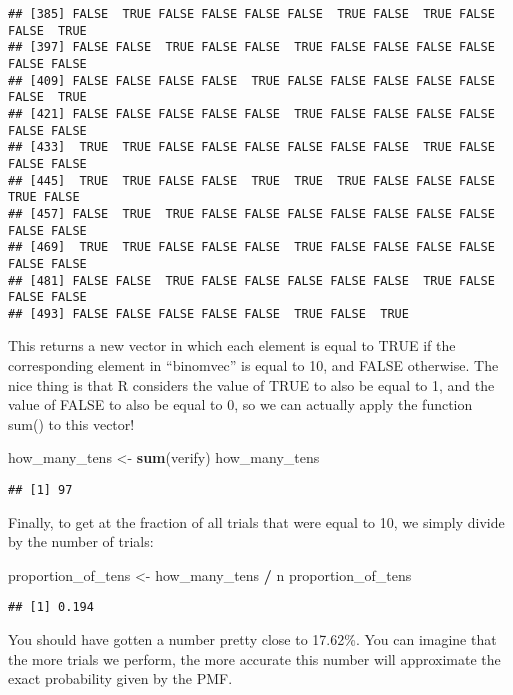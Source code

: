 \documentclass[
]{book}
\newenvironment{Shaded}{\begin{snugshade}}{\end{snugshade}}
\newcommand{\KeywordTok}[1]{\textcolor[rgb]{0.13,0.29,0.53}{\textbf{#1}}}
\newcommand{\NormalTok}[1]{#1}
\newcommand{\OperatorTok}[1]{\textcolor[rgb]{0.81,0.36,0.00}{\textbf{#1}}}
\newcommand{\StringTok}[1]{\textcolor[rgb]{0.31,0.60,0.02}{#1}}
\begin{document}
\begin{verbatim}
## [385] FALSE  TRUE FALSE FALSE FALSE FALSE  TRUE FALSE  TRUE FALSE FALSE  TRUE
## [397] FALSE FALSE  TRUE FALSE FALSE  TRUE FALSE FALSE FALSE FALSE FALSE FALSE
## [409] FALSE FALSE FALSE FALSE  TRUE FALSE FALSE FALSE FALSE FALSE FALSE  TRUE
## [421] FALSE FALSE FALSE FALSE FALSE  TRUE FALSE FALSE FALSE FALSE FALSE FALSE
## [433]  TRUE  TRUE FALSE FALSE FALSE FALSE FALSE FALSE  TRUE FALSE FALSE FALSE
## [445]  TRUE  TRUE FALSE FALSE  TRUE  TRUE  TRUE FALSE FALSE FALSE  TRUE FALSE
## [457] FALSE  TRUE  TRUE FALSE FALSE FALSE FALSE FALSE FALSE FALSE FALSE FALSE
## [469]  TRUE  TRUE FALSE FALSE FALSE  TRUE FALSE FALSE FALSE FALSE FALSE FALSE
## [481] FALSE FALSE  TRUE FALSE FALSE FALSE FALSE FALSE  TRUE FALSE FALSE FALSE
## [493] FALSE FALSE FALSE FALSE FALSE  TRUE FALSE  TRUE
\end{verbatim}

This returns a new vector in which each element is equal to TRUE if the corresponding element in ``binomvec'' is equal to 10, and FALSE otherwise. The nice thing is that R considers the value of TRUE to also be equal to 1, and the value of FALSE to also be equal to 0, so we can actually apply the function sum() to this vector!

\begin{Shaded}
\begin{Highlighting}[]
\NormalTok{how\_many\_tens \textless{}{-}}\StringTok{ }\KeywordTok{sum}\NormalTok{(verify)}
\NormalTok{how\_many\_tens}
\end{Highlighting}
\end{Shaded}

\begin{verbatim}
## [1] 97
\end{verbatim}

Finally, to get at the fraction of all trials that were equal to 10, we simply divide by the number of trials:

\begin{Shaded}
\begin{Highlighting}[]
\NormalTok{proportion\_of\_tens \textless{}{-}}\StringTok{ }\NormalTok{how\_many\_tens }\OperatorTok{/}\StringTok{ }\NormalTok{n}
\NormalTok{proportion\_of\_tens}
\end{Highlighting}
\end{Shaded}

\begin{verbatim}
## [1] 0.194
\end{verbatim}

You should have gotten a number pretty close to 17.62\%. You can imagine that the more trials we perform, the more accurate this number will approximate the exact probability given by the PMF.
\end{document}
